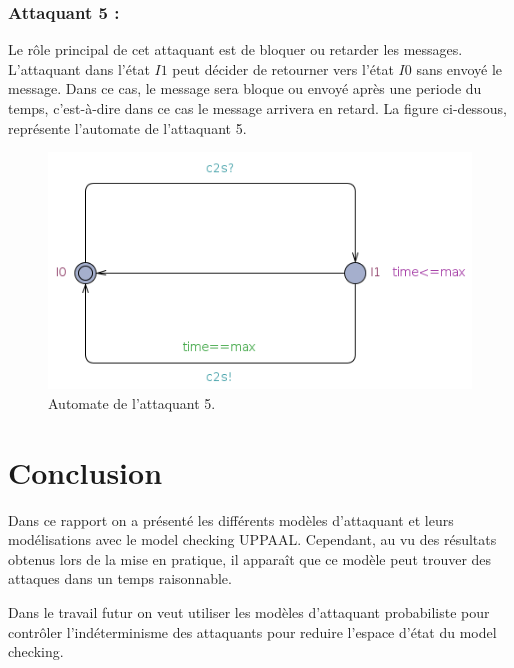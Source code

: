 \documentclass[10pt,a4paper]{article}
\begin{document}
\subsubsection{Attaquant 5 :}
Le rôle principal de cet attaquant est de bloquer ou retarder les messages. L'attaquant dans l'état $I1$ peut décider de retourner vers l'état $I0$ sans envoyé le message. Dans ce cas, le message sera bloque ou envoy\'e après une periode du temps, c’est-à-dire dans ce cas le message arrivera en retard. La figure ci-dessous, représente l'automate de l'attaquant 5.  

\begin{figure}[!h]
\centering 
\includegraphics[scale=0.4]{img/attaquant5.png}
\caption{Automate de l'attaquant 5.}
\end{figure}

\section{Conclusion}
Dans ce rapport on a présenté les différents modèles d'attaquant et leurs modélisations avec le model checking UPPAAL. Cependant, au vu des résultats obtenus lors de la mise en pratique, il appara\^{i}t que ce modèle peut trouver des attaques dans un temps raisonnable.\newline

Dans le travail futur on veut utiliser les modèles d'attaquant probabiliste pour contr\^{o}ler l'indéterminisme des attaquants pour reduire l'espace d'état du model checking.  



\newpage


\end{document}
